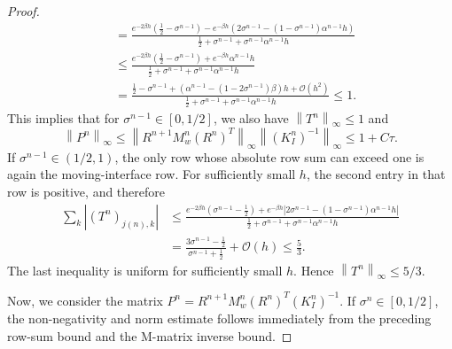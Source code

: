 \documentclass[10pt,a4paper]{amsart}
\newcommand{\abs}[1]{\left\lvert #1 \right\rvert}
\newcommand{\mc}[1]{\mathcal{#1}}
\newcommand{\norm}[1]{\left\lVert #1 \right\rVert}
\newcommand{\paren}[1]{\left(#1\right)}
\begin{document}
\begin{proof}
\begin{equation}
\begin{aligned}
    &= \frac{ e^{-2\beta h}\paren{\frac{1}{2}-\sigma^{n-1}} - e^{-\beta h}\paren{ 2\sigma^{n-1} - \paren{1-\sigma^{n-1}} \alpha^{n-1} h }}{ \frac{1}{2} + \sigma^{n-1} + \sigma^{n-1} \alpha^{n-1} h } \\
     &\le \frac{ e^{-2\beta h}\paren{\frac{1}{2}-\sigma^{n-1}} + e^{-\beta h} \alpha^{n-1} h }{ \frac{1}{2} + \sigma^{n-1} + \sigma^{n-1} \alpha^{n-1} h } \\
     &= \frac{ \frac{1}{2}-\sigma^{n-1} + \paren{\alpha^{n-1} - (1-2\sigma^{n-1})\beta}h + \mc O(h^2) }{ \frac{1}{2} + \sigma^{n-1} + \sigma^{n-1} \alpha^{n-1} h }  \le 1.
\end{aligned}
\end{equation}
This implies that for $\sigma^{n-1} \in[0,1/2]$, we also have $\norm{T^n}_\infty \le 1$  and
\begin{equation}
    \norm{P^n}_\infty \le \norm{ R^{n+1} M_w^{n}  (R^{n})^T}_\infty \norm{(K_I^n)^{-1} }_\infty \le 1 + C\tau.
\end{equation}
If $\sigma^{n-1} \in (1/2,1)$, the only row whose absolute row sum can exceed
one is again the moving-interface row. For sufficiently small $h$, the second
entry in that row is positive, and therefore
\begin{equation}
\begin{aligned}
    \sum_k\abs{(T^n)_{j(n),k}}
    &\le
    \frac{ e^{-2\beta h}\paren{\sigma^{n-1}-\frac12}
    + e^{-\beta h}\abs{2\sigma^{n-1}-(1-\sigma^{n-1})\alpha^{n-1}h}}
    {\frac12+\sigma^{n-1}+\sigma^{n-1}\alpha^{n-1}h}  \\
    &=
    \frac{3\sigma^{n-1}-\frac12}{\sigma^{n-1}+\frac12}+\mc O(h)
    \le \frac53 .
\end{aligned}
\end{equation}
The last inequality is uniform for sufficiently small $h$. Hence $\norm{T^n}_\infty\le5/3$.


Now, we consider the matrix $P^n=R^{n+1} M_w^{n} (R^{n})^T(K_I^n)^{-1}$.
If $\sigma^{n}\in[0,1/2]$, the non-negativity and norm estimate follows immediately from the preceding row-sum bound and the M-matrix inverse bound.


\end{proof}
\end{document}
